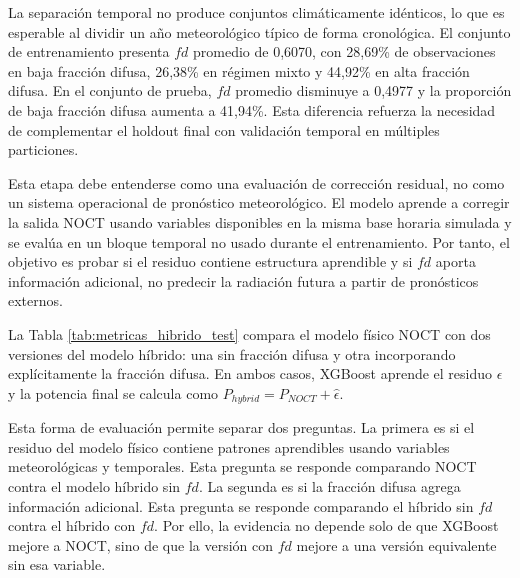 \documentclass[12pt, letterpaper]{article}
\begin{document}
La separaci\'on temporal no produce conjuntos clim\'aticamente id\'enticos, lo que es esperable al dividir un a\~no meteorol\'ogico t\'ipico de forma cronol\'ogica. El conjunto de entrenamiento presenta \(fd\) promedio de 0,6070, con 28,69\% de observaciones en baja fracci\'on difusa, 26,38\% en r\'egimen mixto y 44,92\% en alta fracci\'on difusa. En el conjunto de prueba, \(fd\) promedio disminuye a 0,4977 y la proporci\'on de baja fracci\'on difusa aumenta a 41,94\%. Esta diferencia refuerza la necesidad de complementar el holdout final con validaci\'on temporal en m\'ultiples particiones.

Esta etapa debe entenderse como una evaluaci\'on de correcci\'on residual, no como un sistema operacional de pron\'ostico meteorol\'ogico. El modelo aprende a corregir la salida NOCT usando variables disponibles en la misma base horaria simulada y se eval\'ua en un bloque temporal no usado durante el entrenamiento. Por tanto, el objetivo es probar si el residuo contiene estructura aprendible y si \(fd\) aporta informaci\'on adicional, no predecir la radiaci\'on futura a partir de pron\'osticos externos.

La Tabla \ref{tab:metricas_hibrido_test} compara el modelo f\'isico NOCT con dos versiones del modelo h\'ibrido: una sin fracci\'on difusa y otra incorporando expl\'icitamente la fracci\'on difusa. En ambos casos, XGBoost aprende el residuo \(\epsilon\) y la potencia final se calcula como \(P_{hybrid}=P_{NOCT}+\widehat{\epsilon}\).

Esta forma de evaluación permite separar dos preguntas. La primera es si el residuo del modelo físico contiene patrones aprendibles usando variables meteorológicas y temporales. Esta pregunta se responde comparando NOCT contra el modelo híbrido sin \(fd\). La segunda es si la fracción difusa agrega información adicional. Esta pregunta se responde comparando el híbrido sin \(fd\) contra el híbrido con \(fd\). Por ello, la evidencia no depende solo de que XGBoost mejore a NOCT, sino de que la versión con \(fd\) mejore a una versión equivalente sin esa variable.

\begin{table}[H]
\centering
\caption{Desempe\~no de los modelos en el conjunto temporal de prueba.}
\label{tab:metricas_hibrido_test}
\small
{}
\end{table}
\end{document}
